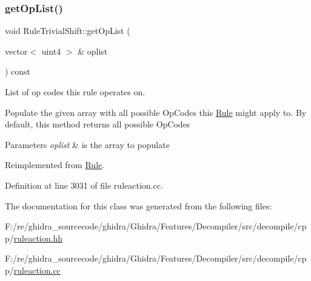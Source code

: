 \subsubsection{\texorpdfstring{getOpList()}{getOpList()}}
{\footnotesize\ttfamily void Rule\+Trivial\+Shift\+::get\+Op\+List (\begin{DoxyParamCaption}\item[{vector$<$ uint4 $>$ \&}]{oplist }\end{DoxyParamCaption}) const\hspace{0.3cm}{\ttfamily [virtual]}}



List of op codes this rule operates on. 

Populate the given array with all possible Op\+Codes this \mbox{\hyperlink{class_rule}{Rule}} might apply to. By default, this method returns all possible Op\+Codes 
\begin{DoxyParams}{Parameters}
{\em oplist} & is the array to populate \\
\hline
\end{DoxyParams}


Reimplemented from \mbox{\hyperlink{class_rule_a4023bfc7825de0ab866790551856d10e}{Rule}}.



Definition at line 3031 of file ruleaction.\+cc.



The documentation for this class was generated from the following files\+:\begin{DoxyCompactItemize}
\item 
F\+:/re/ghidra\+\_\+sourcecode/ghidra/\+Ghidra/\+Features/\+Decompiler/src/decompile/cpp/\mbox{\hyperlink{ruleaction_8hh}{ruleaction.\+hh}}\item 
F\+:/re/ghidra\+\_\+sourcecode/ghidra/\+Ghidra/\+Features/\+Decompiler/src/decompile/cpp/\mbox{\hyperlink{ruleaction_8cc}{ruleaction.\+cc}}\end{DoxyCompactItemize}

